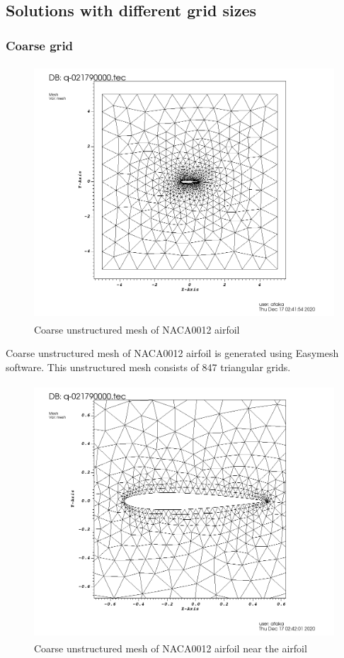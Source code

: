 \documentclass[letterpaper,12pt]{article}
\begin{document}
\subsection{Solutions with different grid sizes}

\subsubsection{Coarse grid}

\begin{figure} [!h]
	\centering
	\includegraphics[height = 9.5cm]{graph/coarse/coarse_8470000.png}
	\caption{Coarse unstructured mesh of NACA0012 airfoil}
    \label{fig:airfoilmeshcoarse}
\end{figure}

\vspace{1cm}

Coarse unstructured mesh of NACA0012 airfoil is generated using Easymesh software. This
unstructured mesh consists of 847 triangular grids.

\newpage

\begin{figure} [!h]
	\centering
	\includegraphics[height = 9.5cm]{graph/coarse/coarse_8470001.png}
	\caption{Coarse unstructured mesh of NACA0012 airfoil near the airfoil}
    \label{fig:airfoilmeshcoarseclose}
\end{figure}
\end{document}

